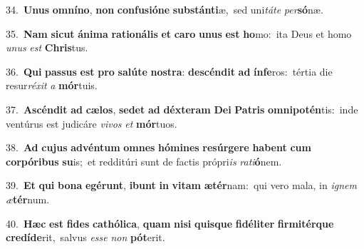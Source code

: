 {{\numbfont\textcolor{\numbcolor}{34.}}~\-\textbf{U}\-\textbf{nus} \textbf{om}\-\textbf{ní}\textbf{no}, \textbf{non} \textbf{con}\-\textbf{fu}\textbf{si}\textbf{ó}\textbf{ne} \textbf{sub}\-\textbf{stán}\textbf{ti}æ,~\star sed uni\-\textit{tá}\-\textit{te} \textit{per}\-\textbf{só}næ.\par
{\numbfont\textcolor{\numbcolor}{35.}}~\textbf{Nam} \textbf{sic}\-\textbf{ut} \textbf{á}\-\textbf{ni}\textbf{ma} \textbf{ra}\-\textbf{ti}\textbf{o}\textbf{ná}\textbf{lis} \textbf{et} \textbf{ca}\-\textbf{ro} \textbf{u}\-\textbf{nus} \textbf{est} \textbf{ho}\-mo:~\star ita Deus et homo \textit{u}\-\textit{nus} \textit{est} \textbf{Chris}\-tus.\par
{\numbfont\textcolor{\numbcolor}{36.}}~\textbf{Qui} \textbf{pas}\-\textbf{sus} \textbf{est} \textbf{pro} \textbf{sa}\-\textbf{lú}\textbf{te} \textbf{nos}\-\textbf{tra}: \textbf{de}\-\textbf{scén}\textbf{dit} \textbf{ad} \textbf{ín}\-\textbf{fe}ros:~\star tértia die resur\-\textit{ré}\-\textit{xit} \textit{a} \textbf{mór}\-tuis.\par
{\numbfont\textcolor{\numbcolor}{37.}}~\-\textbf{A}\-\textbf{scén}\textbf{dit} \textbf{ad} \textbf{cæ}\-\textbf{los}, \textbf{se}\-\textbf{det} \textbf{ad} \textbf{déx}\-\textbf{te}\textbf{ram} \textbf{De}\-\textbf{i} \textbf{Pa}\-\textbf{tris} \textbf{om}\-\textbf{ni}\textbf{pot}\textbf{én}tis:~\star inde ventúrus est judicáre \textit{vi}\-\textit{vos} \textit{et} \textbf{mór}\-tuos.\par
{\numbfont\textcolor{\numbcolor}{38.}}~\textbf{Ad} \textbf{cu}\-\textbf{jus} \textbf{ad}\-\textbf{vén}\textbf{tum} \textbf{om}\-\textbf{nes} \textbf{hó}\-\textbf{mi}\textbf{nes} \textbf{re}\-\textbf{súr}\textbf{ge}\textbf{re} \textbf{ha}\-\textbf{bent} \textbf{cum} \textbf{cor}\-\textbf{pó}\textbf{ri}\textbf{bus} \textbf{su}\-is;~\star et redditúri sunt de factis própri\textit{is} \textit{ra}\-\textit{ti}\textbf{ó}nem.\par
{\numbfont\textcolor{\numbcolor}{39.}}~\textbf{Et} \textbf{qui} \textbf{bo}\-\textbf{na} \textbf{e}\-\textbf{gé}\textbf{runt}, \textbf{i}\-\textbf{bunt} \textbf{in} \textbf{vi}\-\textbf{tam} \textbf{æ}\-\textbf{tér}nam:~\star qui vero mala, in \textit{i}\-\textit{gnem} \textit{æ}\-\textbf{tér}num.\par
{\numbfont\textcolor{\numbcolor}{40.}}~\textbf{Hæc} \textbf{est} \textbf{fi}\-\textbf{des} \textbf{ca}\-\textbf{thó}\textbf{li}\textbf{ca}, \textbf{quam} \textbf{ni}\-\textbf{si} \textbf{quis}\-\textbf{que} \textbf{fi}\-\textbf{dé}\textbf{li}\textbf{ter} \textbf{fir}\-\textbf{mi}\textbf{tér}\textbf{que} \textbf{cre}\-\textbf{dí}\textbf{de}rit,~\star salvus \textit{es}\-\textit{se} \textit{non} \textbf{pót}\-erit.\par
}
